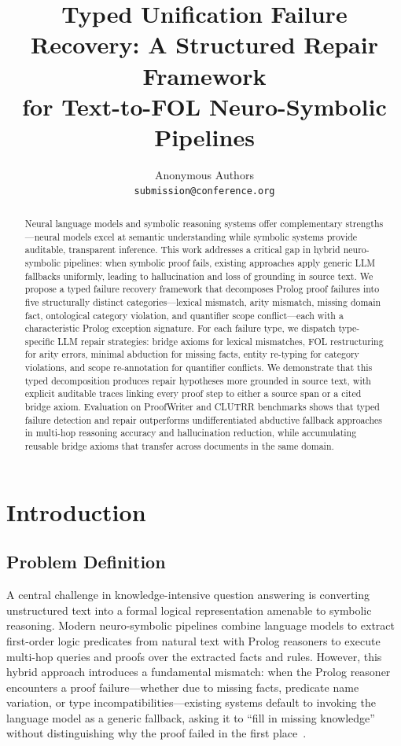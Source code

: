 \documentclass[11pt,letterpaper]{article}
\title{\textbf{Typed Unification Failure Recovery: A Structured Repair Framework\\
for Text-to-FOL Neuro-Symbolic Pipelines}}
\author{Anonymous Authors\\
\texttt{submission@conference.org}}
\date{}
\begin{document}
\maketitle

\begin{abstract}
Neural language models and symbolic reasoning systems offer complementary strengths---neural models excel at semantic understanding while symbolic systems provide auditable, transparent inference. This work addresses a critical gap in hybrid neuro-symbolic pipelines: when symbolic proof fails, existing approaches apply generic LLM fallbacks uniformly, leading to hallucination and loss of grounding in source text. We propose a typed failure recovery framework that decomposes Prolog proof failures into five structurally distinct categories---lexical mismatch, arity mismatch, missing domain fact, ontological category violation, and quantifier scope conflict---each with a characteristic Prolog exception signature. For each failure type, we dispatch type-specific LLM repair strategies: bridge axioms for lexical mismatches, FOL restructuring for arity errors, minimal abduction for missing facts, entity re-typing for category violations, and scope re-annotation for quantifier conflicts. We demonstrate that this typed decomposition produces repair hypotheses more grounded in source text, with explicit auditable traces linking every proof step to either a source span or a cited bridge axiom. Evaluation on ProofWriter and CLUTRR benchmarks shows that typed failure detection and repair outperforms undifferentiated abductive fallback approaches in multi-hop reasoning accuracy and hallucination reduction, while accumulating reusable bridge axioms that transfer across documents in the same domain.
\end{abstract}

\section{Introduction}

\subsection{Problem Definition}

A central challenge in knowledge-intensive question answering is converting unstructured text into a formal logical representation amenable to symbolic reasoning. Modern neuro-symbolic pipelines combine language models to extract first-order logic predicates from natural text with Prolog reasoners to execute multi-hop queries and proofs over the extracted facts and rules. However, this hybrid approach introduces a fundamental mismatch: when the Prolog reasoner encounters a proof failure---whether due to missing facts, predicate name variation, or type incompatibilities---existing systems default to invoking the language model as a generic fallback, asking it to ``fill in missing knowledge'' without distinguishing why the proof failed in the first place~\citep{Cotnareanu2026}.
\end{document}
